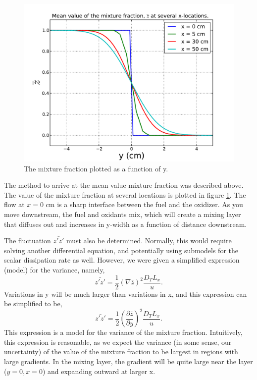 \documentclass{article}
\begin{document}
  \begin{figure}[!htb]
   \begin{center}
    \includegraphics[width = 12 cm]{figs/mean.pdf}
    \caption{The mixture fraction plotted as a function of y.}
    \label{mean}
   \end{center}
   \end{figure}

The method to arrive at the mean value mixture fraction was described
above. The value of the mixture fraction at several locations is plotted
in figure \ref{mean}. The flow at $x=0$ cm is a sharp interface between
the fuel and the oxidizer. As you move downstream, the fuel and oxidants 
mix, which will create a mixing layer that diffuses out and increases in
y-width as a function of distance downstream. 

The fluctuation $\bar{z'z'}$
must also be determined. Normally, this would require solving another
differential equation, and potentially using submodels for the scalar
dissipation rate as well. However, we were given a simplified expression
(model) for the variance, namely, 
\begin{equation}
 \bar{z'z'} = \frac{1}{2} (\nabla \bar z)^2 \frac{D_T L_x}{u}. 
\end{equation}
Variations in y will be much larger than variations in x, and this
expression  
can be simplified to be,
\begin{equation}
 \bar{z'z'} = \frac{1}{2} (\frac{\partial \bar z}{\partial y})^2 \frac{D_T L_x}{u}. 
 \label{fluc}
\end{equation}
This expression is a model for the variance of the mixture
fraction. Intuitively, this expression is reasonable,  as we expect the
variance (in some sense, our uncertainty) of the value of the mixture
fraction to be largest in regions with large gradients. In the mixing
layer, the gradient will be quite large near the layer ($y=0,x=0$) and expanding outward  at larger x. 
\end{document}
